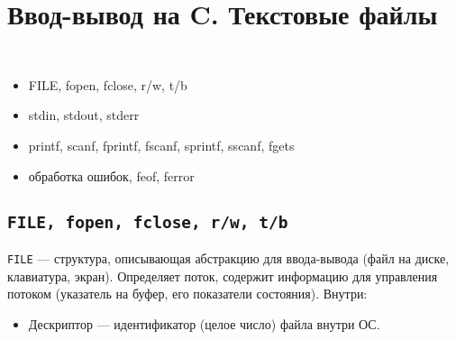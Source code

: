 % 
% 
\section{Ввод-вывод на C. Текстовые файлы}
{\tt
\begin{itemize}[noitemsep]
    \item FILE, fopen, fclose, r/w, t/b
    \item stdin, stdout, stderr
    \item printf, scanf, fprintf, fscanf, sprintf, sscanf, fgets
    \item {\rm обработка ошибок}, feof, ferror
\end{itemize}
    }
\subsection{\tt FILE, fopen, fclose, r/w, t/b}
{\tt FILE} --- структура, описывающая абстракцию для ввода-вывода (файл на диске, клавиатура, экран). Определяет поток, содержит информацию для управления потоком (указатель на буфер, его показатели состояния).
Внутри:
\begin{itemize}[noitemsep]
    \item Дескриптор --- идентификатор (целое число) файла внутри ОС.
\end{itemize}
% 
